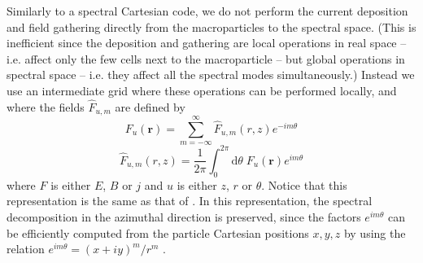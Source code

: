 \documentclass[1p,times,authoryear]{elsarticle}
\newcommand{\TInteg}[1]{\int_{0}^{2\pi} \!\!\!\!\!\! \mathrm{d}#1}
\renewcommand{\vec}[1]{\boldsymbol{#1}}
\begin{document}
Similarly to a spectral Cartesian code, we do not perform the
current deposition and field gathering directly from the
macroparticles to the spectral space. (This is inefficient since the
deposition and gathering are local operations in real space -- i.e. affect
only the few cells next to the macroparticle -- but global operations
in spectral space -- i.e. they affect all the spectral modes
simultaneously.) Instead we use an intermediate grid where these
operations can be performed locally, and where the fields $\hat{F}_{u,m}$
are defined by
\begin{equation} 
\label{eq:IntermBwTrans}
F_u(\vec{r}) = \sum_{m=-\infty}^{\infty} \hat{F}_{u,m}(r,z)
e^{-im\theta} 
\end{equation}
\begin{equation}
\label{eq:IntermFwTrans}
\hat{F}_{u,m}(r,z) = \frac{1}{2\pi} \TInteg{\theta} \;
F_u(\vec{r})e^{im\theta}
\end{equation}
where ${F}$ is either ${E}$, ${B}$ or
${j}$ and $u$ is either $z$, $r$ or $\theta$. Notice that this representation is the
same as that of \citep{Lifschitz, Davidson}. In this
representation, the spectral decomposition in the azimuthal
direction is preserved, since the factors $e^{im\theta}$ can be efficiently computed from the
particle Cartesian positions $x,y,z$ by using the relation $e^{im\theta} = (x+iy)^m/r^m$
\citep{Lifschitz}.
\end{document}
